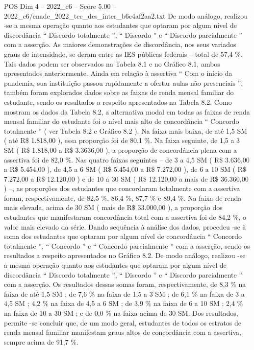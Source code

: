 \begin{textsample}{POS Dim 4 – 2022\_c6 – Score 5.00 – 2022\_c6/enade\_2022\_tec\_des\_inter\_b6c4af2aa2.txt}
De modo análogo, realizou -se a mesma operação quanto aos estudantes que optaram por algum nível de discordância “ Discordo totalmente ”, “ Discordo ” e “ Discordo parcialmente ” com a asserção.
As maiores demonstrações de discordância, nos seus variados graus de intensidade, se deram entre as IES públicas federais – total de 57,4 \%.
Tais dados podem ser observados na Tabela 8.1 e no Gráfico 8.1, ambos apresentados anteriormente.
Ainda em relação à assertiva “ Com o início da pandemia, sua instituição passou rapidamente a ofertar aulas não presenciais ”, também foram explorados dados sobre as faixas de renda mensal familiar do estudante, sendo os resultados a respeito apresentados na Tabela 8.2.
Como mostram os dados da Tabela 8.2, a alternativa modal em todas as faixas de renda mensal familiar do estudante foi o nível mais alto de concordância “ Concordo totalmente ” ( ver Tabela 8.2 e Gráfico 8.2 ).
Na faixa mais baixa, de até 1,5 SM ( até R\$ 1.818,00 ), essa proporção foi de 80,1 \%.
Na faixa seguinte, de 1,5 a 3 SM ( R\$ 1.818,00 a R\$ 3.3636,00 ), a proporção de concordância plena com a assertiva foi de 82,0 \%.
Nas quatro faixas seguintes – de 3 a 4,5 SM ( R\$ 3.636,00 a R\$ 5.454,00 ), de 4,5 a 6 SM ( R\$ 5.454,00 a R\$ 7.272,00 ), de 6 a 10 SM ( R\$ 7.272,00 a R\$ 12.120,00 ) e de 10 a 30 SM ( R\$ 12.120,00 a mais de R\$ 36.360,00 ) –, as proporções dos estudantes que concordaram totalmente com a assertiva foram, respectivamente, de 82,5 \%, 86,4 \%, 87,7 \% e 89,4 \%.
Na faixa de renda mais elevada, acima de 30 SM ( mais de R\$ 33.000,00 ), a proporção dos estudantes que manifestaram concordância total com a assertiva foi de 84,2 \%, o valor mais elevado da série.
Dando sequência à análise dos dados, procedeu -se à soma dos estudantes que optaram por algum nível de concordância “ Concordo totalmente ”, “ Concordo ” e “ Concordo parcialmente ” com a asserção, sendo os resultados a respeito apresentados no Gráfico 8.2.
De modo análogo, realizou -se a mesma operação quanto aos estudantes que optaram por algum nível de discordância “ Discordo totalmente ”, “ Discordo ” e “ Discordo parcialmente ” com a asserção.
Os resultados dessas somas foram, respectivamente, de 8,3 \% na faixa de até 1,5 SM ; de 7,6 \% na faixa de 1,5 a 3 SM ; de 6,1 \% na faixa de 3 a 4,5 SM ; 4,2 \% na faixa de 4,5 a 6 SM ; de 3,9 \% na faixa de 6 a 10 SM ; 2,4 \% na faixa de 10 a 30 SM ; e de 0,0 \% na faixa acima de 30 SM.
Dos resultados, permite -se concluir que, de um modo geral, estudantes de todos os estratos de renda mensal familiar manifestam graus altos de concordância com a assertiva, sempre acima de 91,7 \%.

\end{textsample}
